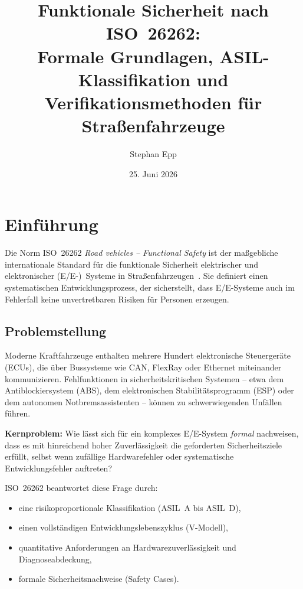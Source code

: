 ﻿\documentclass[a4paper,12pt]{article}
\title{Funktionale Sicherheit nach ISO~26262:\\
Formale Grundlagen, ASIL-Klassifikation und\\
Verifikationsmethoden für Straßenfahrzeuge}
\author{Stephan Epp}
\date{25. Juni 2026}
\theoremstyle{definition}
\begin{document}
\maketitle

\tableofcontents
\newpage

\section{Einführung}

Die Norm ISO~26262 \emph{Road vehicles -- Functional Safety} ist der maßgebliche
internationale Standard für die funktionale Sicherheit elektrischer und
elektronischer (E/E-)~Systeme in Straßenfahrzeugen~\cite{iso26262_2018}.
Sie definiert einen systematischen Entwicklungsprozess, der sicherstellt,
dass E/E-Systeme auch im Fehlerfall keine unvertretbaren Risiken für Personen
erzeugen.

\subsection{Problemstellung}

Moderne Kraftfahrzeuge enthalten mehrere Hundert elektronische Steuergeräte
(ECUs), die über Bussysteme wie CAN, FlexRay oder Ethernet miteinander
kommunizieren. Fehlfunktionen in sicherheitskritischen Systemen -- etwa dem
Antiblockiersystem (ABS), dem elektronischen Stabilitätsprogramm (ESP) oder
dem autonomen Notbremsassistenten -- können zu schwerwiegenden Unfällen führen.

\textbf{Kernproblem:} Wie lässt sich für ein komplexes E/E-System
\emph{formal} nachweisen, dass es mit hinreichend hoher Zuverlässigkeit
die geforderten Sicherheitsziele erfüllt, selbst wenn zufällige Hardware\-fehler
oder systematische Entwicklungsfehler auftreten?

ISO~26262 beantwortet diese Frage durch:
\begin{itemize}
  \item eine risikoproportionale Klassifikation (ASIL~A bis ASIL~D),
  \item einen vollständigen Entwicklungslebenszyklus (V-Modell),
  \item quantitative Anforderungen an Hardwarezuverlässigkeit und
        Diagnoseabdeckung,
  \item formale Sicherheitsnachweise (Safety Cases).
\end{itemize}
\end{document}
